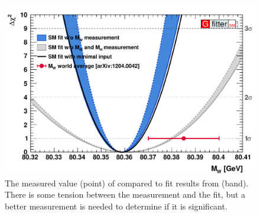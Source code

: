 \begin{figure}[!htb]
    \centering
    \includegraphics[width=\textwidth]{figures/gfitter_wm.pdf}
    \caption[
        The measured value of \MassW compared to fit results from \GFitter.
    ]{
        The measured value (point) of \MassW compared to fit results from
        \GFitter (band). There is some tension between the measurement and the
        fit, but a better measurement is needed to determine if it is
        significant.
    }
    \label{fig:gfitter_mw}
\end{figure}
